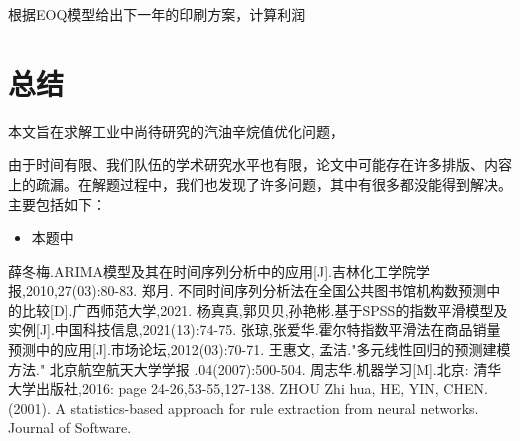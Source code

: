 \documentclass[bwprint]{gmcmthesis}
\begin{document}
根据EOQ模型给出下一年的印刷方案，计算利润

\newpage

\section{总结}

本文旨在求解工业中尚待研究的汽油辛烷值优化问题，

由于时间有限、我们队伍的学术研究水平也有限，论文中可能存在许多排版、内容上的疏漏。在解题过程中，我们也发现了许多问题，其中有很多都没能得到解决。主要包括如下：
\begin{itemize}
	\item 本题中
\end{itemize}


\begin{thebibliography}{9}
 薛冬梅.ARIMA模型及其在时间序列分析中的应用[J].吉林化工学院学报,2010,27(03):80-83.
 郑月. 不同时间序列分析法在全国公共图书馆机构数预测中的比较[D].广西师范大学,2021.
 杨真真,郭贝贝,孙艳彬.基于SPSS的指数平滑模型及实例[J].中国科技信息,2021(13):74-75.
 张琼,张爱华.霍尔特指数平滑法在商品销量预测中的应用[J].市场论坛,2012(03):70-71.
 王惠文, 孟洁."多元线性回归的预测建模方法." 北京航空航天大学学报 .04(2007):500-504.
 周志华.机器学习[M].北京: 清华大学出版社,2016: page 24-26,53-55,127-138.
 ZHOU Zhi hua, HE, YIN, CHEN. (2001). A statistics-based approach for rule extraction from neural networks. Journal of Software.
\end{thebibliography}


\end{document}
